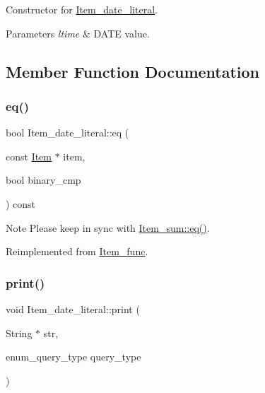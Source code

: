 Constructor for \mbox{\hyperlink{classItem__date__literal}{Item\+\_\+date\+\_\+literal}}. 
\begin{DoxyParams}{Parameters}
{\em ltime} & D\+A\+TE value. \\
\hline
\end{DoxyParams}


\subsection{Member Function Documentation}
\mbox{\label{classItem__date__literal_a34fad994fb206e5c7bacf2f7b8455dd7}} 
\subsubsection{\texorpdfstring{eq()}{eq()}}
{\footnotesize\ttfamily bool Item\+\_\+date\+\_\+literal\+::eq (\begin{DoxyParamCaption}\item[{const \mbox{\hyperlink{classItem}{Item}} $\ast$}]{item,  }\item[{bool}]{binary\+\_\+cmp }\end{DoxyParamCaption}) const\hspace{0.3cm}{\ttfamily [virtual]}}

\begin{DoxyNote}{Note}
Please keep in sync with \mbox{\hyperlink{classItem__sum_aeab749252b834e0be4f00aac8ca523f5}{Item\+\_\+sum\+::eq()}}. 
\end{DoxyNote}


Reimplemented from \mbox{\hyperlink{classItem__func_a3de3f23377e6f0006dfccd375086365f}{Item\+\_\+func}}.

\mbox{\label{classItem__date__literal_af4a9546a669fb4f62178869b7e79f553}} 
\subsubsection{\texorpdfstring{print()}{print()}}
{\footnotesize\ttfamily void Item\+\_\+date\+\_\+literal\+::print (\begin{DoxyParamCaption}\item[{String $\ast$}]{str,  }\item[{enum\+\_\+query\+\_\+type}]{query\+\_\+type }\end{DoxyParamCaption})\hspace{0.3cm}{\ttfamily [virtual]}}

